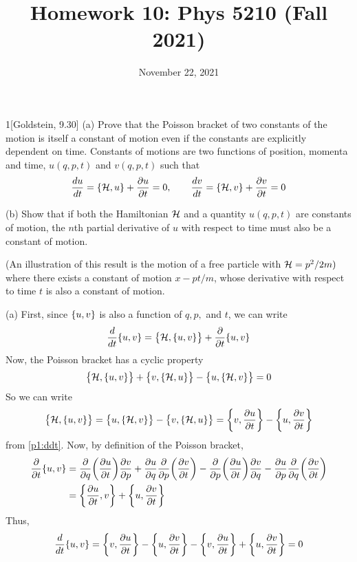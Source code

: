 \documentclass[12pt]{article}
\title{Homework 10: Phys 5210 (Fall 2021)}
\date{November 22, 2021}
\begin{document}
\maketitle
\begin{problem}{1}[Goldstein, 9.30]
(a) Prove that the Poisson bracket of two constants of the motion is itself a
constant of motion even if the constants are explicitly dependent on time.
Constants of motions are two functions of position, momenta and time, $u(q,p,t)$
and $v(q,p,t)$ such that
\begin{equation}\label{p1:ddt}
    \frac{du}{dt}=\qty{\mathcal{H},u}+\frac{\partial u}{\partial t}=0,\qquad
    \frac{dv}{dt}=\qty{\mathcal{H},v}+\frac{\partial v}{\partial t}=0
\end{equation}

(b) Show that if both the Hamiltonian $\mathcal{H}$ and a quantity $u(q,p,t)$ are
constants of motion, the $n$th partial derivative of $u$ with respect to time
must also be a constant of motion.

(An illustration of this result is the motion of a free particle with
$\mathcal{H}=p^2/2m)$ where there exists a constant of motion $x-pt/m$, whose derivative
with respect to time $t$ is also a constant of motion.
\begin{solution}
(a) First, since $\qty{u,v}$ is also a function of $q,p,$ and $t$, we can write
\begin{align}
    \frac{d}{dt}\qty{u,v}=\qty{\mathcal{H},\qty{u,v}}+\frac{\partial}{\partial
    t}\qty{u,v}
\end{align}
Now, the Poisson bracket has a cyclic property
\begin{align}
    \qty{\mathcal{H},\qty{u,v}}+\qty{v,\qty{\mathcal{H},u}}-\qty{u,\qty{\mathcal{H},v}}=0
\end{align}
So we can write
\begin{align}
    \qty{\mathcal{H},\qty{u,v}}
    =\qty{u,\qty{\mathcal{H},v}}-\qty{v,\qty{\mathcal{H},u}}
    =\qty{v,\frac{\partial u}{\partial t}}-\qty{u,\frac{\partial v}{\partial t}}
\end{align}
from \eqref{p1:ddt}. Now, by definition of the Poisson bracket,
\begin{align}
    \frac{\partial}{\partial t}\qty{u,v}
    &=\frac{\partial}{\partial q}\qty(\frac{\partial u}{\partial
    t})\frac{\partial v}{\partial p}+\frac{\partial u}{\partial
q}\frac{\partial}{\partial p}\qty(\frac{\partial v}{\partial t})
-\frac{\partial}{\partial p}\qty(\frac{\partial u}{\partial t})\frac{\partial
v}{\partial q}-\frac{\partial u}{\partial p}\frac{\partial}{\partial
q}\qty(\frac{\partial v}{\partial t})\notag\\
    &=\qty{\frac{\partial u}{\partial t},v}+\qty{u,\frac{\partial v}{\partial t}}
\end{align}
Thus,
\begin{align}
    \frac{d}{dt}\qty{u,v}=\qty{v,\frac{\partial u}{\partial t}}
    -\qty{u,\frac{\partial v}{\partial t}}-\qty{v,\frac{\partial u}{\partial
    t}}+\qty{u,\frac{\partial v}{\partial t}}=0
\end{align}


\end{solution}
\end{problem}
\end{document}
